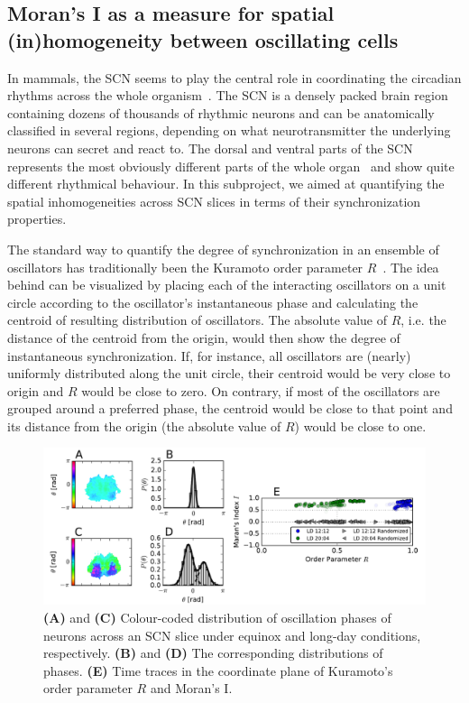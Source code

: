 \subsection{Moran's I as a measure for spatial (in)homogeneity between
oscillating cells}

In mammals, the SCN seems to play the central role in coordinating the
circadian rhythms across the whole
organism~\cite{reppert2002coordination}. The SCN is a densely packed
brain region containing dozens of thousands of rhythmic neurons and
can be anatomically classified in several regions, depending on what
neurotransmitter the underlying neurons can secret and react to. The
dorsal and ventral parts of the SCN represents the most obviously
different parts of the whole organ~\cite{yamaguchi2003synchronization}
and show quite different rhythmical behaviour. In this subproject, we
aimed at quantifying the spatial inhomogeneities across SCN slices in
terms of their synchronization properties.

The standard way to quantify the degree of synchronization in an
ensemble of oscillators has traditionally been the Kuramoto order
parameter $R$~\cite{kuramoto2012chemical}. The idea behind can be
visualized by placing each of the interacting oscillators on a unit
circle according to the oscillator's instantaneous phase and
calculating the centroid of resulting distribution of oscillators. The
absolute value of $R$, i.e. the distance of the centroid from the
origin, would then show the degree of instantaneous synchronization.
If, for instance, all oscillators are (nearly) uniformly distributed
along the unit circle, their centroid would be very close to origin
and $R$ would be close to zero. On contrary, if most of the
oscillators are grouped around a preferred phase, the centroid would
be close to that point and its distance from the origin (the absolute
value of $R$) would be close to one.

\begin{figure}
\begin{center}
\includegraphics[width=\linewidth]{figures/mi/mi.pdf}
\end{center}
\caption{
  {\bf (A)} and {\bf (C)} Colour-coded distribution of oscillation
  phases of neurons across an SCN slice under equinox and long-day
  conditions, respectively.
  {\bf (B)} and {\bf (D)} The corresponding distributions of phases.
  {\bf (E)} Time traces in the coordinate plane of Kuramoto's order
  parameter $R$ and Moran's I.
\label{fig::mi}
}
\end{figure}


